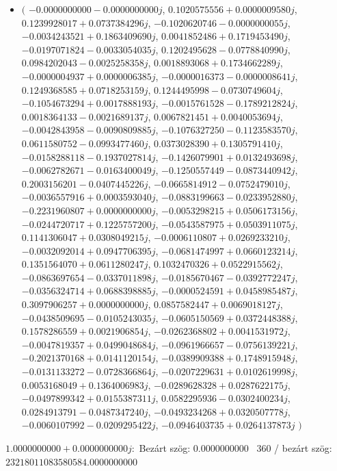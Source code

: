 \documentclass[14pt,a4paper]{article}
\begin{document}
\begin{itemize}
\item
$\big($
$-0.0000000000-0.0000000000j$, $0.1020575556+0.0000009580j$, $0.1239928017+0.0737384296j$, $-0.1020620746-0.0000000055j$, $-0.0034243521+0.1863409690j$, $0.0041852486+0.1719453490j$, $-0.0197071824-0.0033054035j$, $0.1202495628-0.0778840990j$, $0.0984202043-0.0025258358j$, $0.0018893068+0.1734662289j$, $-0.0000004937+0.0000006385j$, $-0.0000016373-0.0000008641j$, $0.1249368585+0.0718253159j$, $0.1244495998-0.0730749604j$, $-0.1054673294+0.0017888193j$, $-0.0015761528-0.1789212824j$, $0.0018364133-0.0021689137j$, $0.0067821451+0.0040053694j$, $-0.0042843958-0.0090809885j$, $-0.1076327250-0.1123583570j$, $0.0611580752-0.0993477460j$, $0.0373028390+0.1305791410j$, $-0.0158288118-0.1937027814j$, $-0.1426079901+0.0132493698j$, $-0.0062782671-0.0163400049j$, $-0.1250557449-0.0873440942j$, $0.2003156201-0.0407445226j$, $-0.0665814912-0.0752479010j$, $-0.0036557916+0.0003593040j$, $-0.0883199663-0.0233952880j$, $-0.2231960807+0.0000000000j$, $-0.0053298215+0.0506173156j$, $-0.0244720717+0.1225757200j$, $-0.0543587975+0.0503911075j$, $0.1141306047+0.0308049215j$, $-0.0006110807+0.0269233210j$, $-0.0032092014+0.0947706395j$, $-0.0681474997+0.0660123214j$, $0.1351564070+0.0611280247j$, $0.1032470326+0.0522915562j$, $-0.0863697654-0.0337011898j$, $-0.0185670467-0.0392772247j$, $-0.0356324714+0.0688398885j$, $-0.0000524591+0.0458985487j$, $0.3097906257+0.0000000000j$, $0.0857582447+0.0069018127j$, $-0.0438509695-0.0105243035j$, $-0.0605150569+0.0372448388j$, $0.1578286559+0.0021906854j$, $-0.0262368802+0.0041531972j$, $-0.0047819357+0.0499048684j$, $-0.0961966657-0.0756139221j$, $-0.2021370168+0.0141120154j$, $-0.0389909388+0.1748915948j$, $-0.0131133272-0.0728366864j$, $-0.0207229631+0.0102619998j$, $0.0053168049+0.1364006983j$, $-0.0289628328+0.0287622175j$, $-0.0497899342+0.0155387311j$, $0.0582295936-0.0302400234j$, $0.0284913791-0.0487347240j$, $-0.0493234268+0.0320507778j$, $-0.0060107992-0.0209295422j$, $-0.0946403735+0.0264137873j$
$\big)$
\end{itemize}
$1.0000000000+0.0000000000j$:\
Bezárt szög: $0.0000000000$ \
360 / bezárt szög: $23218011083580584.0000000000$\
\end{document}
